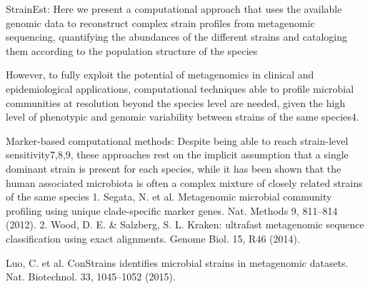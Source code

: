 StrainEst:
Here we present a computational approach that uses the available genomic data to reconstruct complex strain profiles from metagenomic sequencing, quantifying the abundances of the different strains and cataloging them according to the population structure of the species

However, to fully exploit the potential of metagenomics in clinical and epidemiological applications, computational techniques able to profile microbial communities at resolution beyond the species level are needed, given the high level of phenotypic and genomic variability between strains of the same species4.

Marker-based computational methods:  Despite being able to reach strain-level sensitivity7,8,9, these approaches rest on the implicit assumption that a single dominant strain is present for each species, while it has been shown that the human associated microbiota is often a complex mixture of closely related strains of the same species
1. Segata, N. et al. Metagenomic microbial community profiling using unique clade-specific marker genes. Nat. Methods 9, 811–814 (2012).
2. Wood, D. E. & Salzberg, S. L. Kraken: ultrafast metagenomic sequence classification using exact alignments. Genome Biol. 15, R46 (2014).

Luo, C. et al. ConStrains identifies microbial strains in metagenomic datasets. Nat. Biotechnol. 33, 1045–1052 (2015).

